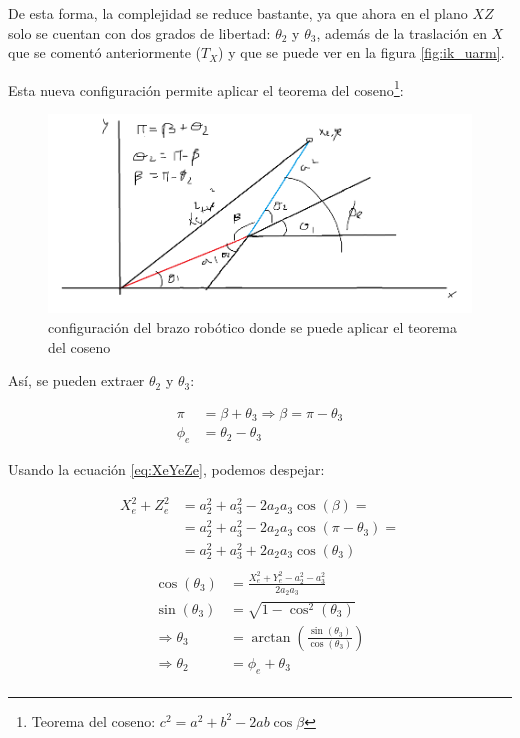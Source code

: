 \documentclass[a4paper,12pt]{article}
\begin{document}
De esta forma, la complejidad se reduce bastante, ya que ahora en el plano $XZ$ solo
se cuentan con dos grados de libertad: $\theta_2$ y $\theta_3$, además de la traslación
en $X$ que se comentó anteriormente ($T_X$) y que se puede ver en la figura \ref{fig:ik_uarm}.

Esta nueva configuración permite aplicar el teorema del coseno\footnote
{Teorema del coseno: $c^2 = a^2 + b^2 - 2ab\cos\beta$}:

\begin{figure}[H]
    \centering
    \includegraphics[width=.8\textwidth]{images/trigonometry.PNG}
    \caption{configuración del brazo robótico donde se puede aplicar el teorema del coseno}
    \label{fig:cos_theorem}
\end{figure}

Así, se pueden extraer $\theta_2$ y $\theta_3$:

\begin{align}
    \pi    & = \beta + \theta_3 \Longrightarrow \beta = \pi - \theta_3 \\
    \phi_e & = \theta_2 - \theta_3
\end{align}

Usando la ecuación \ref{eq:XeYeZe}, podemos despejar:

\begin{align*}
    X_e^2 + Z_e^2 & = a_2^2 + a_3^2 - 2a_2a_3\cos(\beta) =          \\
                  & = a_2^2 + a_3^2 - 2a_2a_3\cos(\pi - \theta_3) = \\
                  & = a_2^2 + a_3^2 + 2a_2a_3\cos(\theta_3)         \\
\end{align*}
\begin{align}
    \cos(\theta_3)           & = \frac{X_e^2 + Y_e^2 - a_2^2 - a_3^2}{2a_2a_3} \label{eq:cos_theta_3} \\
    \sin(\theta_3)           & = \sqrt{1 - \cos^2(\theta_3)} \label{eq:sin_theta_3}                   \\
    \Longrightarrow \theta_3 & = \arctan\left(\frac{\sin(\theta_3)}{\cos(\theta_3)}\right)
    \label{eq:theta_3}                                                                                \\
    \Longrightarrow \theta_2 & = \phi_e + \theta_3 \label{eq:theta_2}                                 \\
\end{align}
\end{document}
